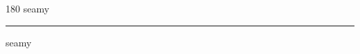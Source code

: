 
\begin{frame}
\begin{center}
\begin{turn}{180}
{\fontsize{2.5cm}{1em}\selectfont seamy}
\end{turn}
\vspace{1em}\par  
\hrule
\vspace{1em}\par  
{\fontsize{2.5cm}{1em}\selectfont seamy}
\end{center}
\end{frame}
